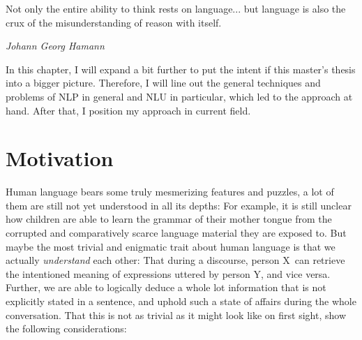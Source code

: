 \label{chap:1_intro}

\epigraph{Not only the entire ability to think rests on language... but language is also the crux of the misunderstanding of reason with itself.}{\textit{Johann Georg Hamann}}

In this chapter, I will expand a bit further to put the intent if this master's thesis into
a bigger picture. Therefore, I will line out the general techniques and problems of NLP in
general and NLU in particular, which led to the approach at hand. {\color{red} After that,
I position my approach in current field.}


\section{Motivation}

Human language bears some truly mesmerizing features and puzzles, a lot of them are still not
yet understood in all its depths: For example, it is still unclear how children are able to
learn the grammar of their mother tongue from the corrupted and comparatively scarce language
material they are exposed to.
But maybe the most trivial and enigmatic trait about human language is that
we actually \emph{understand} each other: That during a discourse, person X can retrieve
the intentioned meaning of expressions uttered by person Y, and vice versa.  Further, we are
able to logically deduce a whole lot information that is not explicitly stated in a sentence,
and uphold such a state of affairs during the whole conversation.
That this is not as trivial as it might look like on first sight, show the following
considerations:

